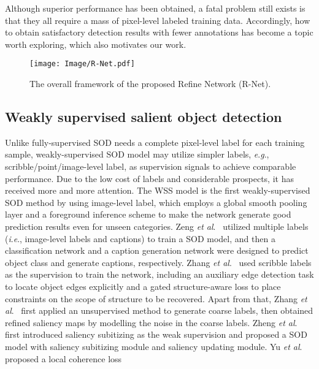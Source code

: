\documentclass[journal]{IEEEtran}
\newcommand{\etal}{\textit{et al}.}
\newcommand{\ie}{\textit{i}.\textit{e}.}
\newcommand{\eg}{\textit{e}.\textit{g}.}
\begin{document}
Although superior performance has been obtained, a fatal problem still exists is that they all require a mass of pixel-level labeled training data. Accordingly, how to obtain satisfactory detection results with fewer annotations has become a topic worth exploring, which also motivates our work.



\begin{figure*}[!t]
    \centering
    \texttt{[image: Image/R-Net.pdf]}
    \caption{The overall framework of the proposed Refine Network (R-Net).}
    \label{fig:r-net}
\end{figure*}

\subsection{Weakly supervised salient object detection}
Unlike fully-supervised SOD needs a complete pixel-level label for each training sample, weakly-supervised SOD model may utilize simpler labels, \eg, scribble/point/image-level label, as supervision signals to achieve comparable performance. Due to the low cost of labels and considerable prospects, it has received more and more attention.
The WSS model \cite{wang2017learning} is the first weakly-supervised SOD method by using image-level label, which employs a global smooth pooling layer and a foreground inference scheme to make the network generate good prediction results even for unseen categories.
Zeng \etal ~\cite{zeng2019multi} utilized multiple labels (\ie, image-level labels and captions) to train a SOD model, and then a classification network and a caption generation network were designed to predict object class and generate captions, respectively.
Zhang \etal ~\cite{zhang2020weakly} used scribble labels as the supervision to train the network, including an auxiliary edge detection task to locate object edges explicitly and a gated structure-aware loss to place constraints on the scope of structure to be recovered.
Apart from that, Zhang \etal ~\cite{zhang2018deep} first applied an unsupervised method to generate coarse labels, then obtained refined saliency maps by modelling the noise in the coarse labels.
Zheng \etal ~\cite{DBLP:journals/tcsv/ZhengTZML21} first introduced saliency subitizing as the weak supervision and proposed a SOD model with saliency subitizing module and saliency updating module.
Yu \etal \cite{DBLP:conf/aaai/YuZXL21} proposed a local coherence loss
\end{document}
